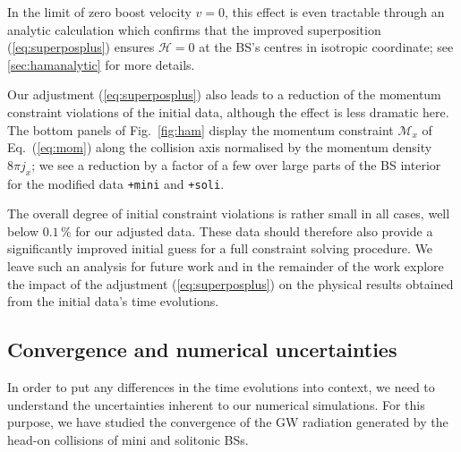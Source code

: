 \documentclass[]{iopart}
\begin{document}
In the limit of zero boost velocity $v=0$, this effect is even
tractable through an analytic calculation which confirms
that the improved superposition (\ref{eq:superposplus})
ensures $\mathcal{H}=0$ at the BS's centres in isotropic
coordinate; see \ref{sec:hamanalytic} for more details.

Our adjustment (\ref{eq:superposplus}) also leads to
a reduction of the momentum constraint violations of the
initial data, although the effect is less dramatic here.
The bottom panels of Fig.~\ref{fig:ham} display the
momentum constraint $\mathcal{M}_x$ of Eq.~(\ref{eq:mom})
along the collision axis normalised by the momentum
density $8\pi j_x$; we see a reduction by a factor of a few
over large parts of the BS interior for the modified
data {\tt +mini} and {\tt +soli}.

The overall degree of initial constraint violations is
rather small in all cases, well below $0.1\,\%$ for
our adjusted data. These data should therefore also
provide a significantly improved initial guess for
a full constraint solving procedure. We leave such an
analysis for future work and in the remainder of the
work explore the impact of the adjustment
(\ref{eq:superposplus}) on the physical results
obtained from the initial data's time evolutions.

\subsection{Convergence and numerical uncertainties}
%
In order to put any differences in the time evolutions
into context, we need to understand the uncertainties
inherent to our numerical simulations. For this purpose,
we have studied the convergence of the GW radiation
generated by the head-on collisions of mini and solitonic
BSs.
\end{document}
